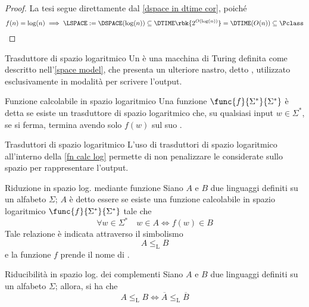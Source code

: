 \documentclass[a4paper, 12pt]{report}
\begin{document}
    \begin{proof}
        La tesi segue direttamente dal \cref{dspace in dtime cor}, poiché $$f(n) = \log(n) \implies \LSPACE := \DSPACE(\log(n)) \subseteq \DTIME \rbk{2^{O(\log(n))}} = \DTIME(O(n)) \subseteq \Pclass$$
    \end{proof}

    \begin{frameddefn}{Trasduttore di spazio logaritmico}
        Un  è una macchina di Turing definita come descritto nell'\cref{space model}, che presenta un ulteriore nastro, detto , utilizzato esclusivamente in modalità  per scrivere l'output.
    \end{frameddefn}

    \begin{frameddefn}[label={fn calc log}]{Funzione calcolabile in spazio logaritmico}
        Una funzione $\func{f}{\Sigma^*}{\Sigma^*}$ è detta  se esiste un trasduttore di spazio logaritmico che, su qualsiasi input $w \in \Sigma^*$, se si ferma, termina avendo solo $f(w)$ sul suo .
    \end{frameddefn}

    \begin{framedobs}{Trasduttori di spazio logaritmico}
        L'uso di trasduttori di spazio logaritmico all'interno della \cref{fn calc log} permette di non penalizzare le \TM considerate sullo spazio per rappresentare l'output.
    \end{framedobs}

    \begin{frameddefn}{Riduzione in spazio log. mediante funzione}
        Siano $A$ e $B$ due linguaggi definiti su un alfabeto $\Sigma$; $A$ è detto essere  se esiste una funzione calcolabile in spazio logaritmico $\func{f}{\Sigma^*}{\Sigma^*}$ tale che $$\forall w \in \Sigma^* \quad w \in A \iff f(w) \in B$$ Tale relazione è indicata attraverso il simbolismo $$A \leq_\mathrm L B$$ e la funzione $f$ prende il nome di .
    \end{frameddefn}

    \begin{framedlem}{Riducibilità in spazio log. dei complementi}
        Siano $A$ e $B$ due linguaggi definiti su un alfabeto $\Sigma$; allora, si ha che $$A \leq_\mathrm L B \iff \overline A \leq_\mathrm L \overline B$$
    \end{framedlem}
\end{document}
